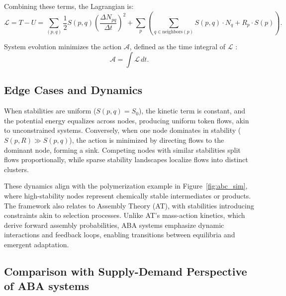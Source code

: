 \documentclass[entropy,article,submit,pdftex,oneauthor]{Definitions/mdpi}
\begin{document}
Combining these terms, the Lagrangian is:
\begin{equation}
\mathcal{L} = T - U = \sum_{(p, q)} \frac{1}{2} S(p, q) \left( \frac{\Delta N_{pq}}{\Delta t} \right)^2 + \sum_{p} \left( \sum_{q \in \text{neighbors}(p)} S(p, q) \cdot N_q + R_p \cdot S(p) \right).
\label{eq:lagrange}
\end{equation}

System evolution minimizes the action \( \mathcal{A} \), defined as the time integral of \( \mathcal{L} \) \cite{goldstein2002classical}:
\begin{equation}
\mathcal{A} = \int \mathcal{L} \, dt.
\label{eq:action}
\end{equation}

\subsection{Edge Cases and Dynamics}
When stabilities are uniform (\( S(p, q) = S_0 \)), the kinetic term is constant, and the potential energy equalizes across nodes, producing uniform token flows, akin to unconstrained systems. Conversely, when one node dominates in stability (\( S(p, R) \gg S(p, q) \)), the action is minimized by directing flows to the dominant node, forming a sink. Competing nodes with similar stabilities split flows proportionally, while sparse stability landscapes localize flows into distinct clusters.

These dynamics align with the polymerization example in Figure~\ref{fig:abc_sim}, where high-stability nodes represent chemically stable intermediates or products. The framework also relates to Assembly Theory (AT), with stabilities introducing constraints akin to selection processes. Unlike AT’s mass-action kinetics, which derive forward assembly probabilities, ABA systems emphasize dynamic interactions and feedback loops, enabling transitions between equilibria and emergent adaptation.

\subsection{Comparison with Supply-Demand Perspective of ABA systems}
\end{document}
